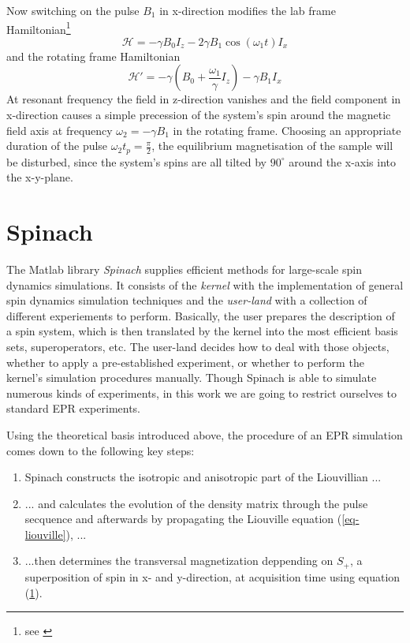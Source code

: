 \documentclass[11.5pt,a4paper]{article}
\begin{document}
Now switching on the pulse $B_1$ in x-direction modifies the lab frame Hamiltonian\footnote{see \cite[Chap. 4.2.2 The resonant radiofrequency field, p.111f]{nmr-ox}}
\begin{equation}
 \mathcal{H} = - \gamma B_0 I_z - 2 \gamma B_1 \cos(\omega_1 t) I_x
\end{equation}
and the rotating frame Hamiltonian
\begin{equation}
  \mathcal{H}' = - \gamma ( B_0 + \frac{\omega_1}{\gamma}I_z) - \gamma B_1 I_x
\end{equation}
At resonant frequency the field in z-direction vanishes and the field component in x-direction causes a simple precession of the system's spin around the magnetic field axis at frequency $\omega_2 = - \gamma B_1$ in the rotating frame. Choosing an appropriate duration of the pulse $\omega_2 t_p = \tfrac{\pi}{2}$, the equilibrium magnetisation of the sample will be disturbed, since the system's spins are all tilted by $90^\circ$ around the x-axis into the x-y-plane. 



\section{Spinach}
The Matlab library \emph{Spinach} supplies efficient methods for large-scale spin dynamics simulations. It consists of the \emph{kernel} with the implementation of general spin dynamics simulation techniques and the \emph{user-land} with a collection of different experiements to perform. Basically, the user prepares the description of a spin system, which is then translated by the kernel into the most efficient basis sets, superoperators, etc. The user-land decides how to deal with those objects, whether to apply a pre-established experiment, or whether to perform the kernel's simulation procedures manually. Though Spinach is able to simulate numerous kinds of experiments, in this work we are going to restrict ourselves to standard EPR experiments. 

Using the theoretical basis introduced above, the procedure of an EPR simulation comes down to the following key steps:
\begin{enumerate}
 \item Spinach constructs the isotropic and anisotropic part of the Liouvillian ...
 \item ... and calculates the evolution of the density matrix through the pulse secquence and afterwards by propagating the Liouville equation (\ref{eq-liouville}), ...
 \item ...then determines the transversal magnetization deppending on $S_+$, a superposition of spin in x- and y-direction, at acquisition time using equation (\ref{}).
\end{enumerate}
\end{document}

